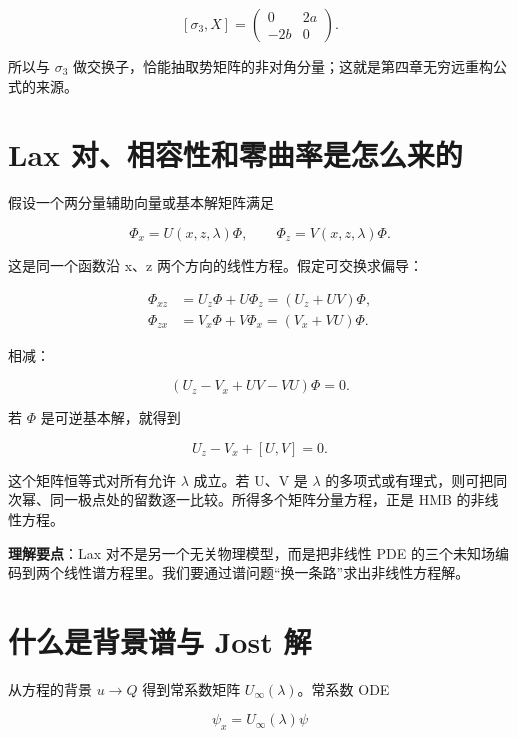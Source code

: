 \[
[\sigma_3,X]=\begin{pmatrix}0&2a\\-2b&0\end{pmatrix}.
\]

所以与 $\sigma{}_{3}$ 做交换子，恰能抽取势矩阵的非对角分量；这就是第四章无穷远重构公式的来源。\par

\section{Lax 对、相容性和零曲率是怎么来的}

假设一个两分量辅助向量或基本解矩阵满足\par

\[
\Phi_x=U(x,z,\lambda)\Phi,
\qquad
\Phi_z=V(x,z,\lambda)\Phi.
\]

这是同一个函数沿 x、z 两个方向的线性方程。假定可交换求偏导：\par

\[
\begin{aligned}
\Phi_{xz}&=U_z\Phi+U\Phi_z=(U_z+UV)\Phi,\\
\Phi_{zx}&=V_x\Phi+V\Phi_x=(V_x+VU)\Phi.
\end{aligned}
\]

相减：\par

\[
(U_z-V_x+UV-VU)\Phi=0.
\]

若 $\Phi{}$ 是可逆基本解，就得到\par

\[
U_z-V_x+[U,V]=0.
\]

这个矩阵恒等式对所有允许 $\lambda{}$ 成立。若 U、V 是 $\lambda{}$ 的多项式或有理式，则可把同次幂、同一极点处的留数逐一比较。所得多个矩阵分量方程，正是 HMB 的非线性方程。\par

\textbf{理解要点}：Lax 对不是另一个无关物理模型，而是把非线性 PDE 的三个未知场编码到两个线性谱方程里。我们要通过谱问题“换一条路”求出非线性方程解。\par

\section{什么是背景谱与 Jost 解}

从方程的背景 $u\to{}Q$ 得到常系数矩阵 $U_{\infty}(\lambda{})$。常系数 ODE\par

\[
\psi_x=U_\infty(\lambda)\psi
\]

